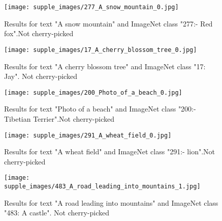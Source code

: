 \documentclass[10pt,twocolumn,letterpaper]{article}
\begin{document}
 \begin{figure*}[t!]
	\centering
			\texttt{[image: supple\_images/277\_A\_snow\_mountain\_0.jpg]}
	\centering
	\caption{Results for text "A snow mountain" and ImageNet class "277:- Red fox".Not cherry-picked}
	\label{fig:t2im3223}
	\vskip -10pt
\end{figure*}
 \begin{figure*}[t!]
	\centering
			\texttt{[image: supple\_images/17\_A\_cherry\_blossom\_tree\_0.jpg]}
	\centering
	\caption{Results for text "A cherry blossom tree" and ImageNet class "17: Jay". Not cherry-picked}
	\label{fig:t2im154}
	\vskip -10pt
\end{figure*}
 \begin{figure*}[t!]
	\centering
			\texttt{[image: supple\_images/200\_Photo\_of\_a\_beach\_0.jpg]}
	\centering
	\caption{Results for text "Photo of a beach" and ImageNet class "200:- Tibetian Terrier".Not cherry-picked}
	\label{fig:t2im143}
	\vskip -10pt
\end{figure*}
 \begin{figure*}[t!]
	\centering
			\texttt{[image: supple\_images/291\_A\_wheat\_field\_0.jpg]}
	\centering
	\caption{Results for text "A wheat field" and ImageNet class "291:- lion".Not cherry-picked}
	\label{fig:t2im432}
	\vskip -10pt
\end{figure*}
 \begin{figure*}[t!]
	\centering
			\texttt{[image: supple\_images/483\_A\_road\_leading\_into\_mountains\_1.jpg]}
	\centering
	\caption{Results for text "A road leading into mountains" and ImageNet class "483: A castle". Not cherry-picked}
	\label{fig:t2im132}
	\vskip -10pt
\end{figure*}
\end{document}
